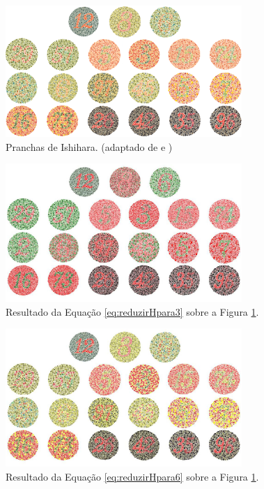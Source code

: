 \documentclass[	12pt, Times, openright, twoside, a4paper, english, brazil]{abntex2}
\begin{document}
\begin{figure}[!htb]
\centering \includegraphics[width=0.80\textwidth]{platesIshihara.png}
\caption{Pranchas de Ishihara. (adaptado de  e ) \label{fig:platesIshihara}}
\end{figure}

\begin{figure}[!htb]
\centering \includegraphics[width=0.80\textwidth]{figuraDeslocarH3.jpg}
\caption{Resultado da Equação \ref{eq:reduzirHpara3} sobre a Figura \ref{fig:platesIshihara}. \label{fig:reduzirHpara3}}
\end{figure}

\begin{figure}[!htb]
\centering \includegraphics[width=0.80\textwidth]{figuraDeslocarH6.jpg}
\caption{Resultado da Equação \ref{eq:reduzirHpara6} sobre a Figura \ref{fig:platesIshihara}. \label{fig:reduzirHpara6}}
\end{figure}
\end{document}
